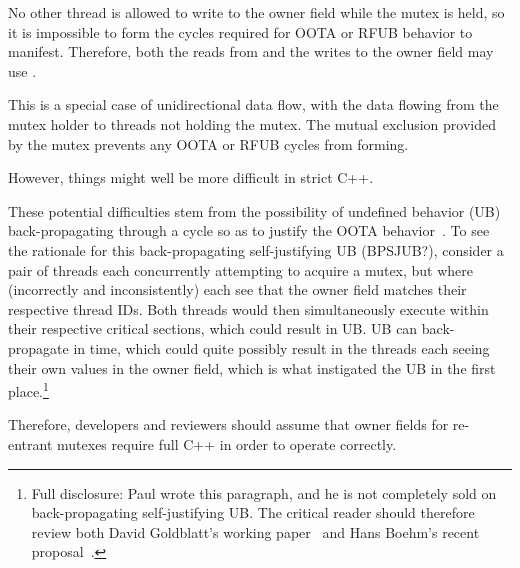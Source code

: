 \documentclass[10]{article}
\begin{document}
No other thread is allowed to write to the owner field while the mutex
is held, so it is impossible to form the cycles required for OOTA or
RFUB behavior to manifest.
Therefore, both the reads from and the writes to the owner field
may use .

This is a special case of unidirectional data flow, with the data flowing
from the mutex holder to threads not holding the mutex.
The mutual exclusion provided by the mutex prevents any OOTA or RFUB
cycles from forming.


However, things might well be more difficult in strict C++.

These potential difficulties stem from the possibility of undefined
behavior (UB) back-propagating through a cycle so as to justify the OOTA
behavior~\cite{DavidGoldblatt2019NoElegantOOTA}.
To see the rationale for this back-propagating self-justifying UB (BPSJUB?),
consider a pair of threads each concurrently attempting to acquire a
mutex, but where (incorrectly and inconsistently) each see that the
owner field matches their respective thread IDs.
Both threads would then simultaneously execute within their respective
critical sections, which could result in UB.
UB can back-propagate in time, which could quite possibly result
in the threads each seeing their own values in the owner field, which
is what instigated the UB in the first place.\footnote{
	Full disclosure: Paul wrote this paragraph, and he is not
	completely sold on back-propagating self-justifying UB.  The
	critical reader should therefore review both David Goldblatt's
	working paper~\cite{DavidGoldblatt2019NoElegantOOTA} and Hans
	Boehm's recent proposal~\cite{HansBoehm2020ConcurrentUB}.}


Therefore, developers and reviewers should assume that owner fields for
re-entrant mutexes require full C++ in order to operate correctly.
\end{document}
